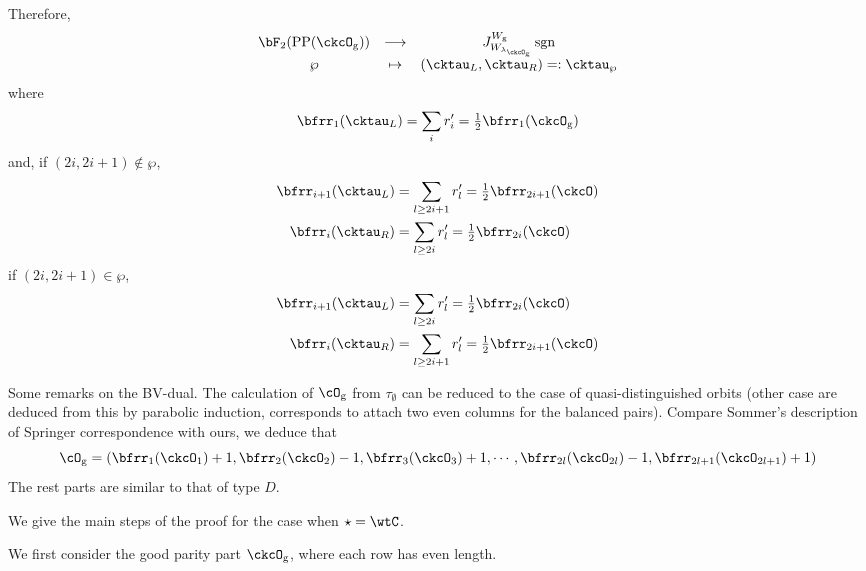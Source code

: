 \documentclass[12pt]{amsart}
\newcommand{\sgn}{\operatorname{sgn}}
\numberwithin{equation}{section}
\theoremstyle{remark}
\def\half{{\tfrac{1}{2}}}
\def\lamckg{\lambda_{\ckcO_{\mathrm g}}}
\def\CPP{\mathrm{PP}}
\begin{document}
{{      Therefore,
      \[
        \begin{array}{ccc}
          \bF_{2}(\CPP(\ckcO_{\mathrm g}))&\longrightarrow
          & J_{W_{\lamckg}}^{W_{\mathrm g}} \sgn \\
          \wp&\mapsto&    (\cktau_{L},\cktau_{R}) =:\cktau_{\wp}
        \end{array}
      \]
      where
      \[
        \bfrr_{1}(\cktau_{L}) = \sum_{i} r'_{i} = \half \bfrr_{1}(\ckcO_{\mathrm g})
      \]
      and, if $(2i,2i+1)\notin \wp$,
      \[
        \begin{split}
          \bfrr_{i+1}(\cktau_{L}) & = \sum_{l\geq 2i+1} r'_{l}
          = \half\bfrr_{2i+1}(\ckcO)\\
          \bfrr_{i}(\cktau_{R}) & = \sum_{l\geq 2i} r'_{l} = \half\bfrr_{2i}(\ckcO)
        \end{split}
      \]
      if $(2i,2i+1)\in \wp$,
      \[
        \begin{split}
          \bfrr_{i+1}(\cktau_{L}) & = \sum_{l\geq 2i} r'_{l}
          = \half\bfrr_{2i}(\ckcO)\\
          \bfrr_{i}(\cktau_{R}) & = \sum_{l\geq 2i+1} r'_{l} = \half\bfrr_{2i+1}(\ckcO)
        \end{split}
      \]

      Some remarks on the BV-dual. The calculation of $\cO_{\mathrm g}$ from
      $\tau_{\emptyset}$ can be reduced to the case of quasi-distinguished
      orbits (other case are deduced from this by parabolic induction,
      corresponds to attach two even columns for the balanced pairs). Compare
      Sommer's description of Springer correspondence with ours, we deduce that
      \[
        \cO_{\mathrm g} = (\bfrr_{1}(\ckcO_{1})+1,\bfrr_{2}(\ckcO_{2})-1,\bfrr_{3}(\ckcO_{3})+1, \cdots, \bfrr_{2l}(\ckcO_{2l})-1,\bfrr_{2l+1}(\ckcO_{2l+1})+1)
      \]
      The rest parts are similar to that of type $D$.
    }


    We give the main steps of the proof for the case when $\star = \wtC$.


    We first consider the good parity part $\ckcO_{\mathrm g}$, where each row has
    even length.

}
\end{document}
